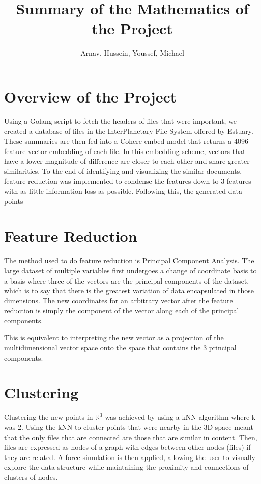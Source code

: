 \documentclass{article}
\begin{document}
\title{Summary of the Mathematics of the Project}
\author{Arnav, Hussein, Youssef, Michael}

\maketitle

\section{Overview of the Project}

Using a Golang script to fetch the headers of files that were important, we created a database of files in the InterPlanetary File System offered by Estuary.
These summaries are then fed into a Cohere embed model that returns a 4096 feature vector embedding of each file.
In this embedding scheme, vectors that have a lower magnitude of difference are closer to each other and share greater similarities.
To the end of identifying and visualizing the similar documents, feature reduction was implemented to condense the features down to 3 features with as little information loss as possible.
Following this, the generated data points 

\section{Feature Reduction}

The method used to do feature reduction is Principal Component Analysis.
The large dataset of multiple variables first undergoes a change of coordinate basis to a basis where three of the vectors are the principal components of the dataset, which is to say that there is the greatest variation of data encapsulated in those dimensions.
The new coordinates for an arbitrary vector after the feature reduction is simply the component of the vector along each of the principal components.

This is equivalent to interpreting the new vector as a projection of the multidimensional vector space onto the space that contains the 3 principal components. 

\section{Clustering}

Clustering the new points in $\mathbb{R}^3$ was achieved by using a kNN algorithm where k was 2.
Using the kNN to cluster points that were nearby in the 3D space meant that the only files that are connected are those that are similar in content.
Then, files are expressed as nodes of a graph with edges between other nodes (files) if they are related.
A force simulation is then applied, allowing the user to visually explore the data structure while maintaining the proximity and connections of clusters of nodes.
\end{document}
